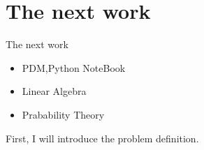 \documentclass[
 size=12pt,
 paper=smartboard,  %
 mode=present, 		%
 display=slides, 	%
 style=tuliplab,  	%
 pauseslide,
 fleqn,leqno]{powerdot}
\begin{document}
\section{The next work}

\begin{slide}{The next work}
  \begin{center}
  \begin{itemize}
    \item
    PDM,Python NoteBook
    \item
    Linear Algebra
    \item
     Prabability Theory
  \end{itemize}
  \end{center}
  \begin{note}
  First, I will introduce the problem definition.
  \end{note}

  \end{slide}





\end{document}
